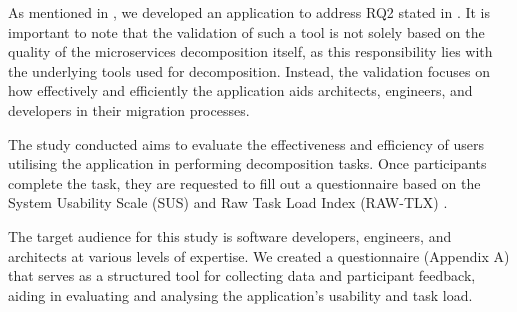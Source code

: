 As mentioned in , we developed an application to address
RQ2 stated in . It is important to note that the
validation of such a tool is not solely based on the quality of the
microservices decomposition itself, as this responsibility lies with the
underlying tools used for decomposition. Instead, the validation focuses on how
effectively and efficiently the application aids architects, engineers, and
developers in their migration processes.

The study conducted aims to evaluate the effectiveness and efficiency of users
utilising the application in performing decomposition tasks. Once participants
complete the task, they are requested to fill out a questionnaire based on the
System Usability Scale (SUS) \cite{brooke1996sus} and Raw Task Load Index
(RAW-TLX) \cite{hart2006nasa}.

The target audience for this study is software developers, engineers, and
architects at various levels of expertise. We created a questionnaire (Appendix
A) that serves as a structured tool for collecting data and participant
feedback, aiding in evaluating and analysing the application's usability and
task load.
